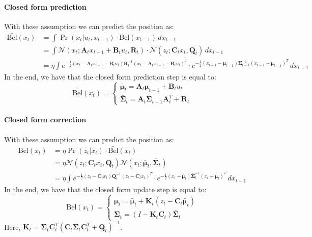 \paragraph*{Closed form prediction}
With these assumption we can predict the position as: 
\begin{align*}
    \bar{\text{Bel}}(x_t)   &=\int\Pr(x_t|u_t,x_{t-1})\cdot\text{Bel}(x_{t-1})\,dx_{t-1} \\
                            &=\int\mathcal{N}(x_t;\mathbf{A}_tx_{t-1}+\mathbf{B}_tu_t,\mathbf{R}_t)\cdot\mathcal{N}(z_t;\mathbf{C}_tx_t,\mathbf{Q}_t)\,dx_{t-1} \\
                            &=\eta\int e^{-\frac{1}{2}(x_t-\mathbf{A}_tx_{t-1}-\mathbf{B}_tu_t)\mathbf{R}_t^{-1}(x_t-\mathbf{A}_tx_{t-1}-\mathbf{B}_tu_t)^T}\cdot e^{-\frac{1}{2}(x_{t-1}-\boldsymbol{\mu}_{t-1})\mathbf{\Sigma}_{t-1}^{-1}(x_{t-1}-\boldsymbol{\mu}_{t-1})^T}\,dx_{t-1}
\end{align*}
In the end, we have that the closed form prediction step is equal to:
\[\bar{\text{Bel}}(x_t)=\begin{cases}
    \bar{\boldsymbol{\mu}}_t=\mathbf{A}_t\boldsymbol{\mu}_{t-1}+\mathbf{B}_tu_t \\
    \bar{\mathbf{\Sigma}}_t=\mathbf{A}_t\mathbf{\Sigma}_{t-1}\mathbf{A}_t^T+\mathbf{R}_t
\end{cases}\]

\paragraph*{Closed form correction}
With these assumption we can predict the position as: 
\begin{align*}
    \text{Bel}(x_t) &=\eta\Pr(z_t|x_t)\cdot\bar{\text{Bel}}(x_t) \\
                    &=\eta\mathcal{N}(z_t;\mathbf{C}_tx_t,\mathbf{Q}_t)\mathcal{N}(x_t;\bar{\boldsymbol{\mu}}_t,\bar{\boldsymbol{\Sigma}}_t) \\
                    &=\eta\int e^{-\frac{1}{2}(z_t-\mathbf{C}_tx_t)\mathbf{Q}_t^{-1}(z_t-\mathbf{C}_tx_t)^T}\cdot e^{-\frac{1}{2}(x_t-\bar{\boldsymbol{\mu}}_t)  \bar{\mathbf{\Sigma}}_t^{-1}   (x_t-\bar{\boldsymbol{\mu}}_t)^T}\,dx_{t-1}
\end{align*}
In the end, we have that the closed form update step is equal to:
\[\text{Bel}(x_t)=\begin{cases}
    \boldsymbol{\mu}_t=\bar{\boldsymbol{\mu}}_t+\mathbf{K}_t(z_t-\mathbf{C}_t\bar{\boldsymbol{\mu}}_t) \\
    \mathbf{\Sigma}_t=(I-\mathbf{K}_t\mathbf{C}_t)\bar{\mathbf{\Sigma}}_t
\end{cases}\]
Here, $\mathbf{K}_t=\bar{\mathbf{\Sigma}}_t\mathbf{C}_t^T\left(\mathbf{C}_t\bar{\mathbf{\Sigma}}_t\mathbf{C}_t^T+\mathbf{Q}_t\right)^{-1}$. 


